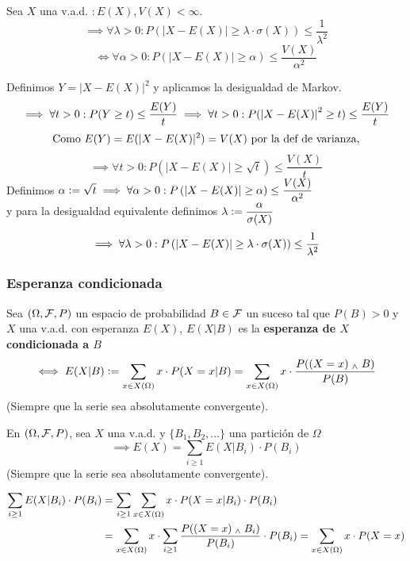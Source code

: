 \begin{teo}
	Sea $X$ una v.a.d. $: E(X), V(X)< \infty$.
	\[\implies \forall \lambda>0 : P(|X-E(X)|\geq \lambda\cdot \sigma(X)) \leq \frac{1}{\lambda^2}\]
	\[\iff \forall \alpha > 0 : \boxed{P\left(|X-E(X)|\geq \alpha\right) \leq \frac{V(X)}{\alpha^2}}\]
	\begin{dem}
		Definimos $Y=|X-E(X)|^2$ y aplicamos la desigualdad de Markov.
		\[\implies \forall t > 0 : P(Y\geq t) \leq \frac{E(Y)}{t} \implies \forall t>0: P(\left|X-E(X)\right|^2\geq t)\leq \frac{E(Y)}{t}\]
		\[\text{Como } E(Y) = E(|X-E(X)|^2) = V(X) \text{ por la def de varianza,}\]
		\[\implies \forall t>0: P\left(|X-E(X)|\geq \sqrt{t}\right)\leq \frac{V(X)}{t}\]
		Definimos $\displaystyle \alpha\vcentcolon= \sqrt{t} \implies \forall \alpha>0:
			P\left(|X-E(X)|\geq \alpha\right)\leq \frac{V(X)}{\alpha^2}$\\ y para la
		desigualdad equivalente definimos $\displaystyle \lambda \vcentcolon= \frac{\alpha}{\sigma(X)}$
		\[\implies \forall \lambda>0 : P\left(\left|X-E(X)\right|\geq \lambda\cdot \sigma(X)\right) \leq \frac{1}{\lambda^2}\]
	\end{dem}
\end{teo}

\subsubsection{Esperanza condicionada}

\begin{defn}
	Sea $(\Omega, \mathcal{F}, P)$ un espacio de probabilidad $B\in \mathcal{F}$ un suceso tal que $P(B)>0$ y  $X$ una v.a.d. con esperanza $E(X)$, $E(X|B)$ es la \textbf{esperanza de $X$ condicionada a $B$}
	\[\iff E(X|B) \vcentcolon= \sum_{x\in X(\Omega)} x \cdot P(X=x | B) = \sum_{x\in X(\Omega)} x \cdot \frac{P((X=x)\; _{\wedge} \; B)}{P(B)}\]
	(Siempre que la serie sea absolutamente convergente).
\end{defn}

\begin{teo}
	En $(\Omega, \mathcal{F}, P)$, sea $X$ una v.a.d. y $\{B_1, B_2, \dots\}$ una partición de $\Omega$
	\[\implies E(X)=\sum_{i\geq 1} E(X|B_i)\cdot P(B_i)\]
	(Siempre que la serie sea absolutamente convergente).
	\begin{dem}
		\[\begin{aligned}
				\sum_{i\geq 1} E(X|B_i)\cdot P(B_i) & =\sum_{i\geq 1}\sum_{x\in X(\Omega)} x\cdot P(X=x|B_i)\cdot P(B_i)                                                           \\
				                                    & =\sum_{x\in X(\Omega)} x\cdot \sum_{i\geq 1}\frac{P((X=x)\; _{\wedge} \; B_i)}{P(B_i)}\cdot P(B_i) = \sum_{x\in X(\Omega)} x\cdot P(X=x)
			\end{aligned}\]
	\end{dem}
\end{teo}

